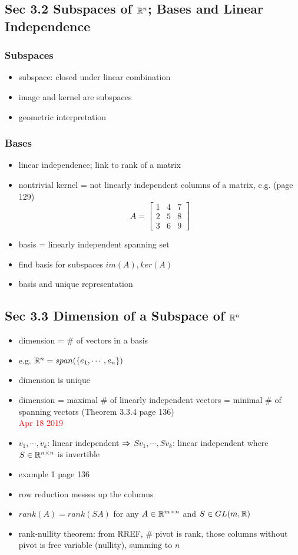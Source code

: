 \documentclass[12pt,a4paper]{article}
\newcommand{\red}[1]{\textcolor{red}{#1}}
\newcommand{\ra}[1]{\ifnum #1=1\rightarrow\fi\ifnum #1=2\Rightarrow\fi\ifnum #1=3\Rrightarrow\fi\ifnum #1=4\rightrightarrows\fi\ifnum #1=5\rightleftarrows\fi\ifnum #1=6\mapsto\fi\ifnum #1=7\iffalse\fi\fi\ifnum #1=8\twoheadrightarrow\fi\ifnum #1=9\rightharpoonup\fi\ifnum #1=0\rightharpoondown\fi}
\renewcommand{\l}{\left}
\renewcommand{\r}{\right}
\newcommand{\x}{\times}
\def\R{\ifmmode\mathbb R\fi}
\begin{document}
\subsection*{Sec 3.2 Subspaces of $\R^n$; Bases and Linear Independence}
\subsubsection*{Subspaces}
\begin{itemize}
    \item subspace: closed under linear combination
    \item image and kernel are subspaces
    \item geometric interpretation
\end{itemize}
\subsubsection*{Bases}
\begin{itemize}
    \item linear independence; link to rank of a matrix
    \item nontrivial kernel = not linearly independent columns of a matrix, e.g. (page 129)
	$$A = \l[
	\begin{array}{ccc}
	    1&4&7\\
	    2&5&8\\
	    3&6&9
	\end{array}
	\r]$$
    \item basis = linearly independent spanning set
    \item find basis for subspaces $im(A), ker(A)$
    \item basis and unique representation
\end{itemize}

\subsection*{Sec 3.3 Dimension of a Subspace of $\R^n$}
\begin{itemize}
    \item dimension = \# of vectors in a basis
    \item e.g. $\R^n = span(\{e_1, \cdots, e_n\})$
    \item dimension is unique 
    \item dimension = maximal \# of linearly independent vectors = minimal \# of spanning vectors (Theorem 3.3.4 page 136)
\red{\\Apr 18 2019}
    \item $v_1, \cdots, v_k$: linear independent $\ra2$ $Sv_1, \cdots, Sv_k$: linear independent where $S \in \R^{n\x n}$ is invertible
    \item example 1 page 136
    \item row reduction messes up the columns
    \item $rank(A) = rank(SA)$ for any $A\in \R^{m\x n}$ and $S \in GL(m, \R)$
    \item rank-nullity theorem: from RREF, \# pivot is rank, those columns without pivot is free variable (nullity), summing to $n$
\end{itemize}
\end{document}
